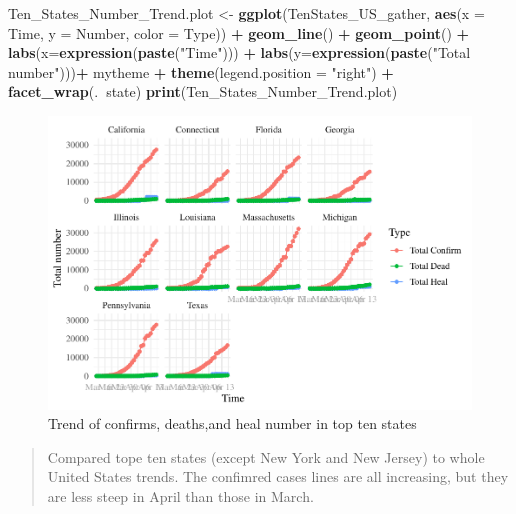 \documentclass[12pt,]{article}
\newenvironment{Shaded}{\begin{snugshade}}{\end{snugshade}}
\newcommand{\DataTypeTok}[1]{\textcolor[rgb]{0.13,0.29,0.53}{#1}}
\newcommand{\KeywordTok}[1]{\textcolor[rgb]{0.13,0.29,0.53}{\textbf{#1}}}
\newcommand{\NormalTok}[1]{#1}
\newcommand{\OperatorTok}[1]{\textcolor[rgb]{0.81,0.36,0.00}{\textbf{#1}}}
\newcommand{\StringTok}[1]{\textcolor[rgb]{0.31,0.60,0.02}{#1}}
\begin{document}
\begin{Shaded}
\begin{Highlighting}[]
\NormalTok{Ten_States_Number_Trend.plot <-}
\StringTok{  }\KeywordTok{ggplot}\NormalTok{(TenStates_US_gather, }\KeywordTok{aes}\NormalTok{(}\DataTypeTok{x =}\NormalTok{ Time, }\DataTypeTok{y =}\NormalTok{ Number, }\DataTypeTok{color =}\NormalTok{ Type)) }\OperatorTok{+}
\StringTok{  }\KeywordTok{geom_line}\NormalTok{() }\OperatorTok{+}
\StringTok{  }\KeywordTok{geom_point}\NormalTok{() }\OperatorTok{+}
\StringTok{  }\KeywordTok{labs}\NormalTok{(}\DataTypeTok{x=}\KeywordTok{expression}\NormalTok{(}\KeywordTok{paste}\NormalTok{(}\StringTok{"Time"}\NormalTok{))) }\OperatorTok{+}\StringTok{ }
\StringTok{  }\KeywordTok{labs}\NormalTok{(}\DataTypeTok{y=}\KeywordTok{expression}\NormalTok{(}\KeywordTok{paste}\NormalTok{(}\StringTok{"Total number"}\NormalTok{)))}\OperatorTok{+}
\StringTok{  }\NormalTok{mytheme }\OperatorTok{+}\StringTok{ }
\StringTok{  }\KeywordTok{theme}\NormalTok{(}\DataTypeTok{legend.position =} \StringTok{"right"}\NormalTok{) }\OperatorTok{+}
\StringTok{  }\KeywordTok{facet_wrap}\NormalTok{(.}\OperatorTok{~}\NormalTok{state)}
\KeywordTok{print}\NormalTok{(Ten_States_Number_Trend.plot)}
\end{Highlighting}
\end{Shaded}

\begin{figure}
\centering
\includegraphics{Feng_ENV872_Project_files/figure-latex/Ten_States_Number_Trend.plot-1.pdf}
\caption{Trend of confirms, deaths,and heal number in top ten states}
\end{figure}

\begin{quote}
Compared tope ten states (except New York and New Jersey) to whole
United States trends. The confimred cases lines are all increasing, but
they are less steep in April than those in March.
\end{quote}
\end{document}
